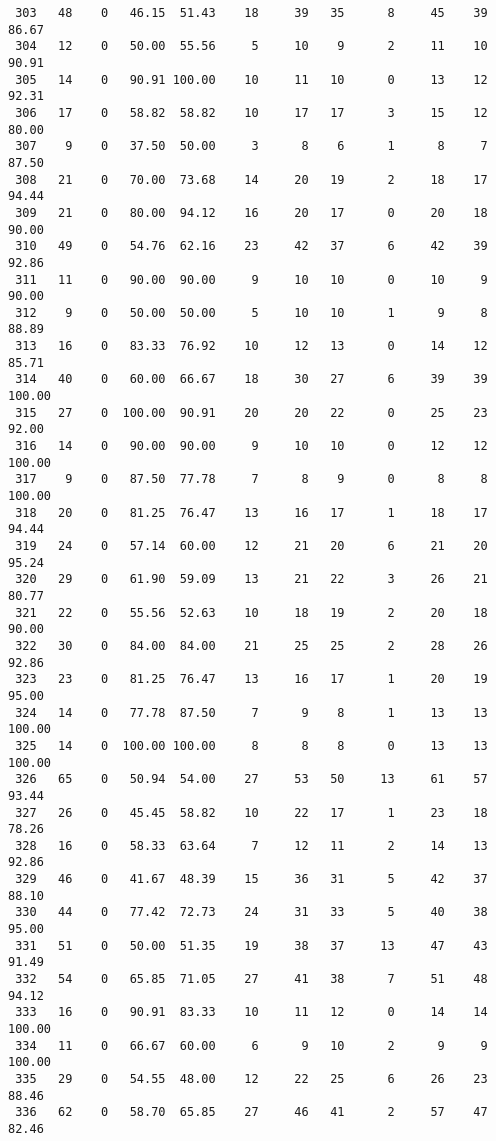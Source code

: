 \begin{verbatim}
 303   48    0   46.15  51.43    18     39   35      8     45    39    86.67
 304   12    0   50.00  55.56     5     10    9      2     11    10    90.91
 305   14    0   90.91 100.00    10     11   10      0     13    12    92.31
 306   17    0   58.82  58.82    10     17   17      3     15    12    80.00
 307    9    0   37.50  50.00     3      8    6      1      8     7    87.50
 308   21    0   70.00  73.68    14     20   19      2     18    17    94.44
 309   21    0   80.00  94.12    16     20   17      0     20    18    90.00
 310   49    0   54.76  62.16    23     42   37      6     42    39    92.86
 311   11    0   90.00  90.00     9     10   10      0     10     9    90.00
 312    9    0   50.00  50.00     5     10   10      1      9     8    88.89
 313   16    0   83.33  76.92    10     12   13      0     14    12    85.71
 314   40    0   60.00  66.67    18     30   27      6     39    39   100.00
 315   27    0  100.00  90.91    20     20   22      0     25    23    92.00
 316   14    0   90.00  90.00     9     10   10      0     12    12   100.00
 317    9    0   87.50  77.78     7      8    9      0      8     8   100.00
 318   20    0   81.25  76.47    13     16   17      1     18    17    94.44
 319   24    0   57.14  60.00    12     21   20      6     21    20    95.24
 320   29    0   61.90  59.09    13     21   22      3     26    21    80.77
 321   22    0   55.56  52.63    10     18   19      2     20    18    90.00
 322   30    0   84.00  84.00    21     25   25      2     28    26    92.86
 323   23    0   81.25  76.47    13     16   17      1     20    19    95.00
 324   14    0   77.78  87.50     7      9    8      1     13    13   100.00
 325   14    0  100.00 100.00     8      8    8      0     13    13   100.00
 326   65    0   50.94  54.00    27     53   50     13     61    57    93.44
 327   26    0   45.45  58.82    10     22   17      1     23    18    78.26
 328   16    0   58.33  63.64     7     12   11      2     14    13    92.86
 329   46    0   41.67  48.39    15     36   31      5     42    37    88.10
 330   44    0   77.42  72.73    24     31   33      5     40    38    95.00
 331   51    0   50.00  51.35    19     38   37     13     47    43    91.49
 332   54    0   65.85  71.05    27     41   38      7     51    48    94.12
 333   16    0   90.91  83.33    10     11   12      0     14    14   100.00
 334   11    0   66.67  60.00     6      9   10      2      9     9   100.00
 335   29    0   54.55  48.00    12     22   25      6     26    23    88.46
 336   62    0   58.70  65.85    27     46   41      2     57    47    82.46

\end{verbatim}
